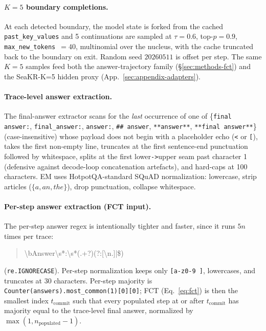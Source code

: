 \documentclass[11pt]{article}
\begin{document}
\paragraph{$K{=}5$ boundary completions.} At each detected boundary, the model state is forked from the cached \texttt{past\_key\_values} and 5 continuations are sampled at $\tau{=}0.6$, top-$p{=}0.9$, \texttt{max\_new\_tokens}~$=40$, multinomial over the nucleus, with the cache truncated back to the boundary on exit. Random seed $20260511$ is offset per step. The same $K{=}5$ samples feed both the answer-trajectory family (\S\ref{sec:methods-fct}) and the SeaKR-K=5 hidden proxy (App.~\ref{sec:appendix-adapters}).

\paragraph{Trace-level answer extraction.} The final-answer extractor scans for the \emph{last} occurrence of one of \{\texttt{final answer:}, \texttt{final\_answer:}, \texttt{answer:}, \texttt{\#\# answer}, \texttt{**answer**}, \texttt{**final answer**}\} (case-insensitive) whose payload does not begin with a placeholder echo (\texttt{<} or \texttt{[}), takes the first non-empty line, truncates at the first sentence-end punctuation followed by whitespace, splits at the first lower\texttt{->}upper seam past character 1 (defensive against decode-loop concatenation artefacts), and hard-caps at 100 characters. EM uses HotpotQA-standard SQuAD normalization: lowercase, strip articles ($\{a, an, the\}$), drop punctuation, collapse whitespace.

\paragraph{Per-step answer extraction (FCT input).} The per-step answer regex is intentionally tighter and faster, since it runs $5n$ times per trace:
\begin{quote}\small\ttfamily
\textbackslash bAnswer\textbackslash s*:\textbackslash s*(.+?)(?:[\textbackslash n.]|\$)
\end{quote}
\noindent (\texttt{re.IGNORECASE}). Per-step normalization keeps only \texttt{[a-z0-9 ]}, lowercases, and truncates at 30 characters. Per-step majority is \texttt{Counter(answers).most\_common(1)[0][0]}; FCT (Eq.~\ref{eq:fct}) is then the smallest index $t_{\text{commit}}$ such that every populated step at or after $t_{\text{commit}}$ has majority equal to the trace-level final answer, normalized by $\max(1, n_{\text{populated}}{-}1)$.
\end{document}
